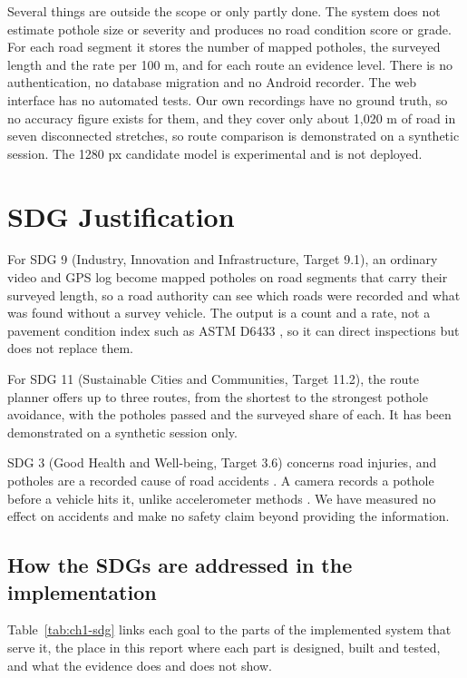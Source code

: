 Several things are outside the scope or only partly done. The system does not estimate pothole size or severity and produces no road condition score or grade. For each road segment it stores the number of mapped potholes, the surveyed length and the rate per 100 m, and for each route an evidence level. There is no authentication, no database migration and no Android recorder. The web interface has no automated tests. Our own recordings have no ground truth, so no accuracy figure exists for them, and they cover only about 1,020 m of road in seven disconnected stretches, so route comparison is demonstrated on a synthetic session. The 1280 px candidate model is experimental and is not deployed.

\section{SDG Justification}
For SDG 9 (Industry, Innovation and Infrastructure, Target 9.1), an ordinary video and GPS log become mapped potholes on road segments that carry their surveyed length, so a road authority can see which roads were recorded and what was found without a survey vehicle. The output is a count and a rate, not a pavement condition index such as ASTM D6433 \cite{astm2020d6433}, so it can direct inspections but does not replace them.

For SDG 11 (Sustainable Cities and Communities, Target 11.2), the route planner offers up to three routes, from the shortest to the strongest pothole avoidance, with the potholes passed and the surveyed share of each. It has been demonstrated on a synthetic session only.

SDG 3 (Good Health and Well-being, Target 3.6) concerns road injuries, and potholes are a recorded cause of road accidents \cite{morth2023road}. A camera records a pothole before a vehicle hits it, unlike accelerometer methods \cite{eriksson2008pothole}. We have measured no effect on accidents and make no safety claim beyond providing the information.

\subsection{How the SDGs are addressed in the implementation}
Table~\ref{tab:ch1-sdg} links each goal to the parts of the implemented system that serve it, the place in this report where each part is designed, built and tested, and what the evidence does and does not show.

